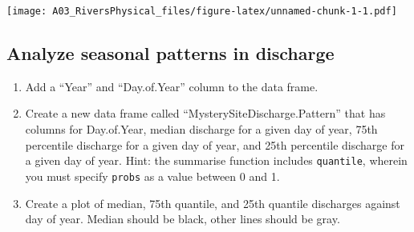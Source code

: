 \documentclass[]{article}
\providecommand{\tightlist}{%
  \setlength{\itemsep}{0pt}\setlength{\parskip}{0pt}}
\begin{document}
\texttt{[image: A03\_RiversPhysical\_files/figure-latex/unnamed-chunk-1-1.pdf]}

\hypertarget{analyze-seasonal-patterns-in-discharge}{%
\subsection{Analyze seasonal patterns in
discharge}\label{analyze-seasonal-patterns-in-discharge}}

\begin{enumerate}
\def\labelenumi{\arabic{enumi}.}
\setcounter{enumi}{4}
\tightlist
\item
  Add a ``Year'' and ``Day.of.Year'' column to the data frame.
\item
  Create a new data frame called ``MysterySiteDischarge.Pattern'' that
  has columns for Day.of.Year, median discharge for a given day of year,
  75th percentile discharge for a given day of year, and 25th percentile
  discharge for a given day of year. Hint: the summarise function
  includes \texttt{quantile}, wherein you must specify \texttt{probs} as
  a value between 0 and 1.
\item
  Create a plot of median, 75th quantile, and 25th quantile discharges
  against day of year. Median should be black, other lines should be
  gray.
\end{enumerate}
\end{document}
